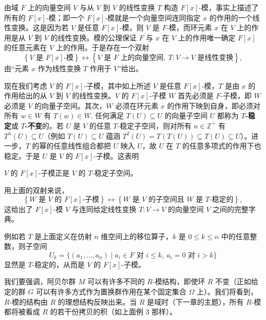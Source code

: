 由域 \(F\) 上的向量空间 \(V\) 与从 \(V\) 到 \(V\) 的线性变换 \(T\) 构造 \(F[x]\)-模，事实上描述了所有的 \(F[x]\)-模；即一个 \(F[x]\)-模就是一个向量空间连同指定 \(x\) 的作用的一个线性变换。这是因为若 \(V\) 是任意 \(F[x]\)-模，则 \(V\) 是 \(F\)-模，而环元素 \(x\) 在 \(V\) 上的作用是从 \(V\) 到 \(V\) 的线性变换。模的公理保证 \(F\) 与 \(x\) 在 \(V\) 上的作用唯一确定 \(F[x]\) 的任意元素在 \(V\) 上的作用。于是存在一个双射
\[
\left\{ V \text{ 是 } F[x]\text{-模} \right\} \longleftrightarrow \left\{ V \text{ 是 } F \text{ 上的向量空间},\ T: V \to V \text{ 是线性变换} \right\},
\]
由“元素 \(x\) 作为线性变换 \(T\) 作用于 \(V\)”给出。

现在我们考虑 \(V\) 的 \(F[x]\)-子模，其中如上所述 \(V\) 是任意 \(F[x]\)-模，\(T\) 是由 \(x\) 的作用给出的从 \(V\) 到 \(V\) 的线性变换。\(V\) 的 \(F[x]\)-子模 \(W\) 首先必须是 \(F\)-子模，即 \(W\) 必须是 \(V\) 的向量子空间。其次，\(W\) 必须在环元素 \(x\) 的作用下映到自身，即必须对所有 \(w \in W\) 有 \(T(w) \in W\). 任何满足 \(T(U) \subseteq U\) 的向量子空间 \(U\) 都称为 \textbf{\(T\)-稳定}或 \textbf{\(T\)-不变}的。若 \(U\) 是 \(V\) 的任意 \(T\)-稳定子空间，则对所有 \(n \in \mathbb{Z}^+\) 有 \(T^n(U) \subseteq U\)（例如 \(T(U) \subseteq U\) 蕴涵 \(T^2(U) = T(T(U)) \subseteq T(U) \subseteq U\)）。进一步，\(T\) 的幂的任意线性组合都把 \(U\) 映入 \(U\)，故 \(U\) 在 \(T\) 的任意多项式的作用下也稳定。于是 \(U\) 是 \(V\) 的 \(F[x]\)-子模。这表明

\begin{center}
\(V\) 的 \(F[x]\)-子模正是 \(V\) 的 \(T\)-稳定子空间。
\end{center}

用上面的双射来说，
\[
\left\{ W \text{ 是 } V \text{ 的 } F[x]\text{-子模} \right\} \longleftrightarrow \left\{ W \text{ 是 } V \text{ 的子空间且 } W \text{ 是 } T\text{-稳定的} \right\},
\]
这给出了 \(F[x]\)-模 \(V\) 与连同给定线性变换 \(T: V \to V\) 的向量空间 \(V\) 之间的完整字典。

例如若 \(T\) 是上面定义在仿射 \(n\) 维空间上的移位算子，\(k\) 是 \(0 \leq k \leq n\) 中的任意整数，则子空间
\[
U_k = \{(a_1, \ldots, a_n) \mid a_i \in F \text{ 对 } i \le k,\ a_i = 0 \text{ 对 } i > k\}
\]
显然是 \(T\)-稳定的，从而是 \(V\) 的 \(F[x]\)-子模。

我们要强调，阿贝尔群 \(M\) 可以有许多不同的 \(R\)-模结构，即使环 \(R\) 不变（正如给定的群 \(G\) 可以有许多方式作为置换群作用在某个固定集合 \(\Omega\) 上）。我们将看到，\(R\)-模的结构由 \(R\) 的理想结构反映出来。当 \(R\) 是域时（下一章的主题），所有 \(R\)-模都将被看成 \(R\) 的若干份拷贝的积（如上面例 3 那样）。

